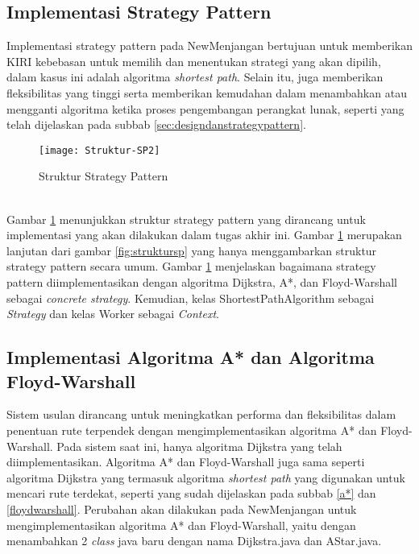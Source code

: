 \subsection{Implementasi Strategy Pattern}
Implementasi strategy pattern pada NewMenjangan bertujuan untuk memberikan KIRI kebebasan untuk memilih dan menentukan strategi yang akan dipilih, dalam kasus ini adalah algoritma \textit{shortest path}. Selain itu, juga memberikan fleksibilitas yang tinggi serta memberikan kemudahan dalam menambahkan atau mengganti algoritma ketika proses pengembangan perangkat lunak, seperti yang telah dijelaskan pada subbab \ref{sec:designdanstrategypattern}.
\begin{figure}[h] 
    \centering  
    \texttt{[image: Struktur-SP2]}  
    \caption{Struktur Strategy Pattern}
    \label{fig:struktursp2} 
\end{figure}
\\
Gambar \ref{fig:struktursp2} menunjukkan struktur strategy pattern yang dirancang untuk implementasi yang akan dilakukan dalam tugas akhir ini. Gambar \ref{fig:struktursp2} merupakan lanjutan dari gambar \ref{fig:struktursp} yang hanya menggambarkan struktur strategy pattern secara umum. Gambar \ref{fig:struktursp2} menjelaskan bagaimana strategy pattern diimplementasikan dengan algoritma Dijkstra, A*, dan Floyd-Warshall sebagai \textit{concrete strategy}. Kemudian, kelas ShortestPathAlgorithm sebagai \textit{Strategy} dan kelas Worker sebagai \textit{Context}.

\subsection{Implementasi Algoritma A* dan Algoritma Floyd-Warshall}
Sistem usulan dirancang untuk meningkatkan performa dan fleksibilitas dalam penentuan rute terpendek dengan mengimplementasikan algoritma A* dan Floyd-Warshall. Pada sistem saat ini, hanya algoritma Dijkstra yang telah diimplementasikan. Algoritma A* dan Floyd-Warshall juga sama seperti algoritma Dijkstra yang termasuk algoritma \textit{shortest path} yang digunakan untuk mencari rute terdekat, seperti yang sudah dijelaskan pada subbab \ref{a*} dan \ref{floydwarshall}. Perubahan akan dilakukan pada NewMenjangan untuk mengimplementasikan algoritma A* dan Floyd-Warshall, yaitu dengan menambahkan 2 \textit{class} java baru dengan nama Dijkstra.java dan AStar.java.